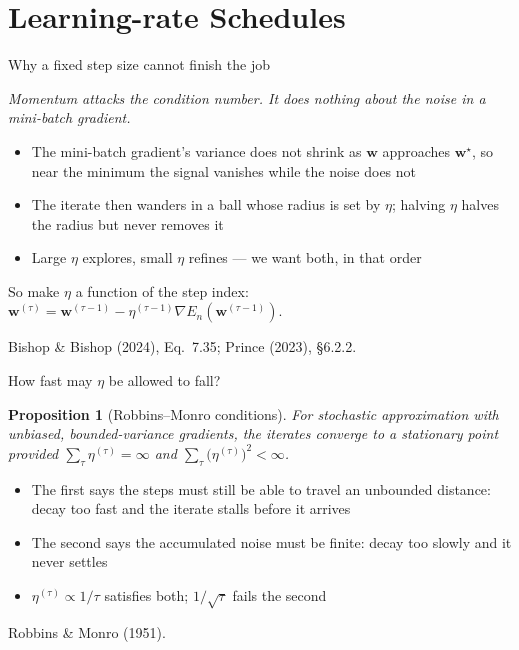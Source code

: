 \documentclass[aspectratio=169, 11pt]{beamer}
\newtheorem{propx}[theorem]{Proposition}
\newcommand{\bridge}[1]{%
  {\scriptsize\itshape\color{mcMuted} #1\par}\vspace{0.35em}}
\newcommand{\srcline}[1]{%
  \par\vspace{0.25em}%
  {\scriptsize\color{mcMuted}\hfill #1\par}}
\newcommand{\src}[3]{}      %
\begin{document}
\section{Learning-rate Schedules}

\begin{frame}{Why a fixed step size cannot finish the job}
  \src{bishop2024}{equation}{7.35}
  \src{bishop2024}{section}{7.3.2}
  \src{prince2023}{section}{6.2.2}
  \bridge{Momentum attacks the condition number. It does nothing about
  the noise in a mini-batch gradient.}
  \vspace{0.3em}
  \begin{itemize}\itemsep0.35em
    \item The mini-batch gradient's variance does not shrink as $\mathbf{w}$
          approaches $\mathbf{w}^\star$, so near the minimum the signal vanishes
          while the noise does not
    \item The iterate then wanders in a ball whose radius is set by
          $\eta$; halving $\eta$ halves the radius but never removes it
    \item Large $\eta$ explores, small $\eta$ refines --- we want both,
          in that order
  \end{itemize}
  \begin{redhighlight}
    So make $\eta$ a function of the step index:
    $\mathbf{w}^{(\tau)} = \mathbf{w}^{(\tau-1)}
     - \eta^{(\tau-1)}\nabla E_n(\mathbf{w}^{(\tau-1)})$.
  \end{redhighlight}
  \srcline{Bishop \& Bishop (2024), Eq.~7.35; Prince (2023), \S6.2.2.}
\end{frame}

\begin{frame}{How fast may $\eta$ be allowed to fall?}
  \src{robbins1951}{equation}{6}
  \src{robbins1951}{equation}{26}
  \src{robbins1951}{section}{3}
  \vspace{-0.35em}
  \begin{propx}[Robbins--Monro conditions]\label{th:rm}
    \small
    For stochastic approximation with unbiased, bounded-variance
    gradients, the iterates converge to a stationary point provided
    $\sum_{\tau} \eta^{(\tau)} = \infty$ and
    $\sum_{\tau} \big(\eta^{(\tau)}\big)^{2} < \infty$.
  \end{propx}
  \vspace{0.3em}
  \begin{itemize}\itemsep0.3em
    \item The first says the steps must still be able to travel an
          unbounded distance: decay too fast and the iterate stalls
          before it arrives
    \item The second says the accumulated noise must be finite: decay
          too slowly and it never settles
    \item $\eta^{(\tau)} \propto 1/\tau$ satisfies both;
          $1/\sqrt{\tau}$ fails the second
  \end{itemize}
  \srcline{Robbins \& Monro (1951).}
\end{frame}
\end{document}
